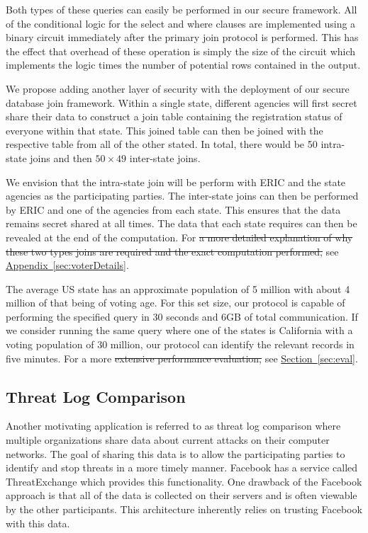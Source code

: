 \documentclass[11pt,letterpaper]{article}
\newcommand{\namedref}[2]{\hyperref[#2]{#1~\ref*{#2}}}
\newcommand{\sectionref}[1]{\namedref{Section}{#1}}
\newcommand{\appendixref}[1]{\namedref{Appendix}{#1}}
\providecommand{\DIFaddtex}[1]{{\protect\color{blue}\uwave{#1}}} %
\providecommand{\DIFdeltex}[1]{{\protect\color{red}\sout{#1}}}                      %
\providecommand{\DIFaddbegin}{} %
\providecommand{\DIFaddend}{} %
\providecommand{\DIFdelbegin}{} %
\providecommand{\DIFdelend}{} %
\providecommand{\DIFadd}[1]{\texorpdfstring{\DIFaddtex{#1}}{#1}} %
\providecommand{\DIFdel}[1]{\texorpdfstring{\DIFdeltex{#1}}{}} %
\begin{document}
Both types of these queries can easily be performed in our secure framework. All of the conditional logic for the select and where clauses are implemented using a binary circuit immediately after the primary join protocol is performed. This has the effect that overhead of these operation is simply the size of the circuit which implements the logic times the number of potential rows contained in the output.  
\else

We propose adding another layer of security with the deployment of our secure database join framework. Within a single state, different agencies will first secret share their data to construct a join table containing the registration status of everyone within that state. This joined table can then be joined with the respective table from all of the other stated. In total, there would be 50 intra-state joins and then $50\times49$ inter-state joins. 

We envision that the intra-state join will be perform with ERIC and the state agencies as the participating parties. The inter-state joins can then be performed by ERIC and one of the agencies from each state. This ensures that the data remains secret shared at all times. The data that each state requires can then be revealed at the end of the computation. For \DIFdelbegin \DIFdel{a more detailed explanation of why these two types joins are required and the exact computation performed, }\DIFdelend \DIFaddbegin \DIFadd{more details }\DIFaddend see \appendixref{sec:voterDetails}.

\fi


The average US state has an approximate population of 5 million with about 4 million of that being of voting age. For this set size, our protocol is capable of performing the specified query in 30 seconds and 6GB of total communication. If we consider running the same query where one of the states is California with a voting population of 30 million, our protocol can identify the relevant records in five minutes. For a more \DIFdelbegin \DIFdel{extensive performance evaluation, }\DIFdelend \DIFaddbegin \DIFadd{details }\DIFaddend see \sectionref{sec:eval}.

\subsection{Threat Log Comparison}\label{sec:threatlog}

Another motivating application is referred to as threat log comparison where multiple organizations share data about current attacks on their computer networks. The goal of sharing this data is to allow the participating parties to identify and stop threats in a more timely manner. Facebook has a service called ThreatExchange\cite{threat} which provides this functionality. One drawback of the Facebook approach is that all of the data is collected on their servers and is often viewable by the other participants. This architecture inherently relies on trusting Facebook with this data. 
\end{document}
